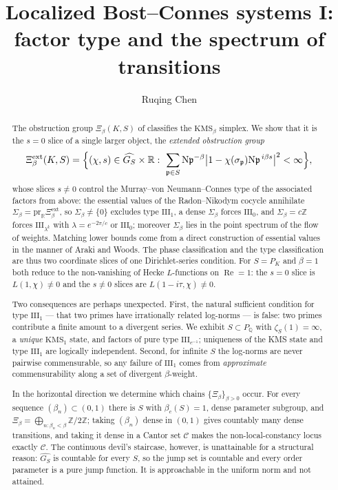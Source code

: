 \documentclass[11pt]{amsart}
\title[Factor type and the spectrum of transitions]{Localized Bost--Connes systems I:\\ factor type and the spectrum of transitions}
\author{Ruqing Chen}
\date{}
\numberwithin{equation}{section}
\theoremstyle{definition}
\theoremstyle{remark}
\newcommand{\Z}{\mathbb{Z}}
\newcommand{\Q}{\mathbb{Q}}
\newcommand{\R}{\mathbb{R}}
\newcommand{\cC}{\mathcal{C}}
\newcommand{\pp}{\mathfrak{p}}
\newcommand{\Ns}{\mathrm{N}}
\newcommand{\Xiext}{\Xi^{\mathrm{ext}}_\beta}
\begin{document}
\begin{abstract}
The obstruction group $\Xi_\beta(K,S)$ of \cite{Main} classifies the $\mathrm{KMS}_\beta$
simplex. We show that it is the $s=0$ slice of a single larger object, the \emph{extended
obstruction group}
\[
\Xiext(K,S)=\Bigl\{(\chi,s)\in\widehat{G_S}\times\R:\ \sum_{\pp\in S}\Ns\pp^{-\beta}\bigl|1-\chi(\sigma_\pp)\Ns\pp^{\,i\beta s}\bigr|^2<\infty\Bigr\},
\]
whose slices $s\ne0$ control the Murray--von Neumann--Connes type of the associated
factors from above: the essential values of the Radon--Nikodym cocycle annihilate
$\Sigma_\beta=\mathrm{pr}_\R\Xiext$, so $\Sigma_\beta\ne\{0\}$ excludes type
$\mathrm{III}_1$, a dense $\Sigma_\beta$ forces $\mathrm{III}_0$, and $\Sigma_\beta=c\Z$
forces $\mathrm{III}_{\lambda^k}$ with $\lambda=e^{-2\pi/c}$ or $\mathrm{III}_0$; moreover
$\Sigma_\beta$ lies in the point spectrum of the flow of weights. Matching lower bounds come
from a direct construction of essential values in the manner of Araki and Woods. The phase
classification and the type classification are thus two coordinate slices of one
Dirichlet-series condition. For $S=P_K$ and $\beta=1$ both reduce to the non-vanishing of Hecke $L$-functions
on $\operatorname{Re}=1$: the $s=0$ slice is $L(1,\chi)\ne0$ and the $s\ne0$ slices are
$L(1-i\tau,\chi)\ne0$.

Two consequences are perhaps unexpected. First, the natural sufficient condition for type
$\mathrm{III}_1$ --- that two primes have irrationally related log-norms --- is false: two
primes contribute a finite amount to a divergent series. We exhibit $S\subset P_\Q$ with
$\zeta_S(1)=\infty$, a \emph{unique} $\mathrm{KMS}_1$ state, and factors of pure type
$\mathrm{III}_{e^{-1}}$; uniqueness of the KMS state and type $\mathrm{III}_1$ are logically
independent. Second, for infinite $S$ the log-norms are never pairwise commensurable, so any
failure of $\mathrm{III}_1$ comes from \emph{approximate} commensurability along a set of
divergent $\beta$-weight.

In the horizontal direction we determine which chains $\{\Xi_\beta\}_{\beta>0}$ occur. For
every sequence $(\beta_n)\subset(0,1)$ there is $S$ with $\beta_c(S)=1$, dense parameter
subgroup, and $\Xi_\beta=\bigoplus_{n:\beta_n<\beta}\Z/2\Z$; taking $(\beta_n)$ dense in
$(0,1)$ gives countably many dense transitions, and taking it dense in a Cantor set $\cC$
makes the non-local-constancy locus exactly $\cC$. The continuous devil's staircase, however,
is unattainable for a structural reason: $\widehat{G_S}$ is countable for every $S$, so the
jump set is countable and every order parameter is a pure jump function. It is approachable
in the uniform norm and not attained.
\end{abstract}
\end{document}
